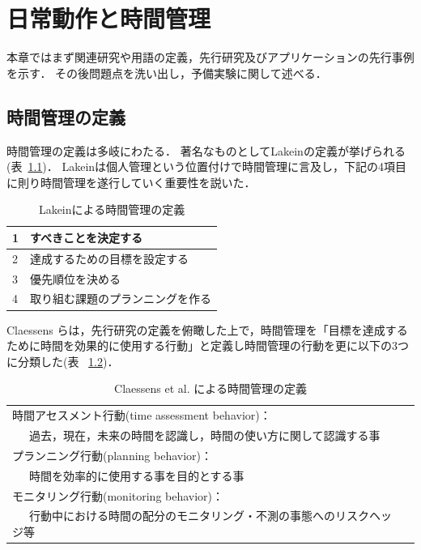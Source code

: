 \chapter{日常動作と時間管理}
本章ではまず関連研究や用語の定義，先行研究及びアプリケーションの先行事例を示す．
その後問題点を洗い出し，予備実験に関して述べる．

\section{時間管理の定義}
時間管理の定義は多岐にわたる．
著名なものとしてLakeinの定義\cite{Lakein1989}が挙げられる(表~\ref{tb:Lakein})．
Lakeinは個人管理という位置付けで時間管理に言及し，下記の4項目に則り時間管理を遂行していく重要性を説いた．

\begin{table}[htb]
\begin{center}
  \caption{Lakeinによる時間管理の定義}
  \begin{tabular}{|l|l|} \hline
   1 & すべきことを決定する \\ \hline
   2 & 達成するための目標を設定する \\ \hline
   3 & 優先順位を決める \\ \hline
   4 & 取り組む課題のプランニングを作る \\ \hline
  \end{tabular}
  \label{tb:Lakein}
\end{center}
\end{table}

Claessens らは，先行研究の定義を俯瞰した上で，時間管理を「目標を達成するために時間を効果的に使用する行動」と定義し時間管理の行動を更に以下の3つに分類した\cite{Claessens2007}(表 ~\ref{tb:Claessens})．

\begin{table}[htb]
\begin{center}
  \caption{Claessens et al. による時間管理の定義}
  \begin{tabular}{|l|l|} \hline
   時間アセスメント行動(time assessment behavior)： \\ ~~~過去，現在，未来の時間を認識し，時間の使い方に関して認識する事 \\ \hline
   プランニング行動(planning behavior)：　\\  ~~~時間を効率的に使用する事を目的とする事 \\ \hline
   モニタリング行動(monitoring behavior)： \\ ~~~行動中における時間の配分のモニタリング・不測の事態へのリスクヘッジ等 \\ \hline
  \end{tabular}
  \label{tb:Claessens}
\end{center}
\end{table}

